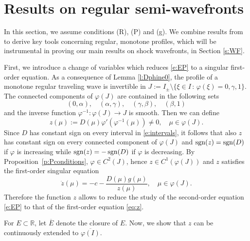 \documentclass[11pt,a4paper]{article}
\newcommand{\sgn}{\mathop{\rm sgn}}
\renewcommand{\phi}{\varphi}
\begin{document}

\section{Results on regular semi-wavefronts}\label{s:RSWFs}
\setcounter{equation}{0}
In this section, we assume conditions (R), (P) and (g). We combine results from \cite{BCM2, BCM3} to derive key tools concerning regular, monotone profiles, which will be instrumental in proving our main results on shock wavefronts, in Section \ref{s:WF}.

First, we introduce a change of variables which reduces \eqref{e:EP} to a singular first-order equation. As a consequence of Lemma \ref{l:Dphine0}, the profile of a monotone regular traveling wave is invertible in  $J := I_{\pm}\setminus \{\xi\in I \, : \, \phi(\xi)= 0, \gamma, 1\}$. The connected components of $\phi(J)$ are contained in the following sets
\begin{equation}\label{e:intervals}
(0, \alpha), \quad (\alpha, \gamma), \quad (\gamma, \beta),\quad (\beta, 1)
\end{equation} 
and the inverse function $\varphi^{-1}: \varphi(J) \to J$ is smooth. Then we can define
\begin{equation}\label{e:z}
z(\mu):=D(\mu)\phi'\left(\phi^{-1}(\mu)\right) \neq 0, \quad \mu \in \varphi(J).
\end{equation}
Since $D$ has constant sign on every interval in \eqref{e:intervals}, it follows that also $z$ has  constant sign on every connected component of $\phi(J)$ and $\sgn(z)=\sgn(D)$ if $\phi$ is increasing while $\sgn(z)=-\sgn(D)$ if $\phi$ is decreasing. By Proposition~\ref{p:Pconditions}, $\phi \in C^2(J)$, hence  $z \in C^1(\phi(J))$ and $z$ satisfies the first-order singular equation
\begin{equation}\label{eq:z}
  \dot z(\mu)=-c-\frac{D(\mu)g(\mu)}{z(\mu)}, \quad  \mu \in \phi(J).
\end{equation}
Therefore the function $z$ allows to reduce the study of the second-order equation \eqref{e:EP} to that of the first-order equation \eqref{eq:z}. 

For $E\subset \mathbb{R}$, let $\overline{E}$ denote the closure of $E$. Now, we show that $z$ can be continuously extended to $\overline{\phi(I)}$. 
\end{document}
